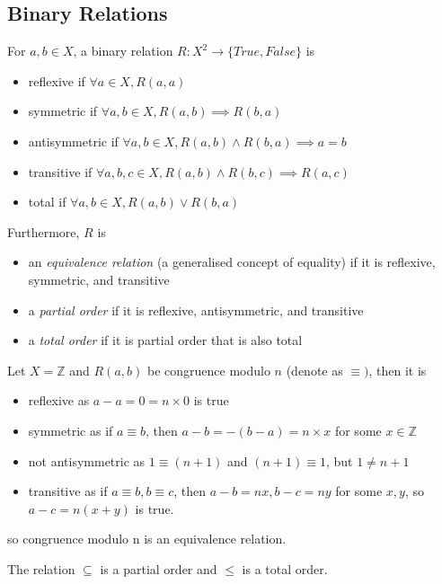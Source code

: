 \documentclass[11pt]{article}
\begin{document}
\subsection{Binary Relations}
\begin{definition}
  For \(a,b \in X\), a binary relation \(R: X^2 \rightarrow \{True, False\}\) is
  \begin{itemize}
    \item reflexive if \(\forall a \in X, R(a,a)\)
    \item symmetric if \(\forall a,b \in X, R(a,b) \implies R(b,a)\)
    \item antisymmetric if \(\forall a,b \in X, R(a,b) \land R(b,a) \implies a = b\)
    \item transitive if \(\forall a,b,c \in X, R(a,b) \land R(b,c) \implies R(a,c)\)
    \item total if \(\forall a,b \in X, R(a,b) \lor R(b,a)\)
  \end{itemize}
  Furthermore, \(R\) is 
  \begin{itemize}
    \item an \textit{equivalence relation} (a generalised concept of equality) if it is reflexive, symmetric, and transitive
    \item a \textit{partial order} if it is reflexive, antisymmetric, and transitive
    \item a \textit{total order} if it is partial order that is also total
  \end{itemize}
\end{definition}

\begin{example}
  Let \(X = \mathbb{Z}\) and \(R(a,b)\) be congruence modulo \(n\) (denote as \(\equiv)\), then it is
  \begin{itemize}
    \item reflexive as \(a-a = 0 = n \times 0\) is true
    \item symmetric as if \(a \equiv b\), then \(a-b=-(b-a)=n \times x\) for some \(x \in \mathbb{Z}\)
    \item not antisymmetric as \(1 \equiv (n+1)\) and \((n+1) \equiv 1\), but \(1 \neq n+1\)
    \item transitive as if \(a \equiv b, b \equiv c\), then \(a-b=nx, b-c = ny\) for some \(x,y\), so \(a-c=n(x+y)\) is true.
  \end{itemize}
  so congruence modulo n is an equivalence relation.
\end{example}
\begin{example}
  The relation \(\subseteq\) is a partial order and \(\leq\) is a total order.
\end{example}
\end{document}
